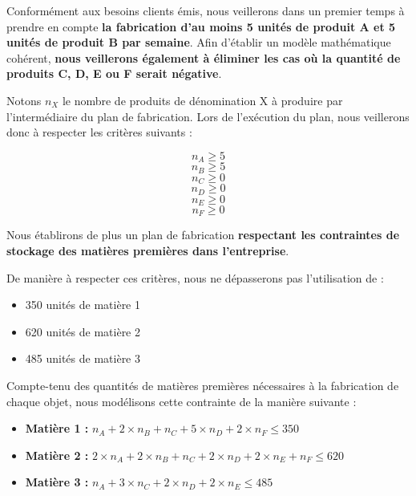 \documentclass[a4paper,10pt]{article}
\begin{document}
Conformément aux besoins clients émis, nous veillerons dans un premier temps à prendre en compte \textbf{la fabrication d'au moins 5 unités de produit A et 5 unités de produit B par semaine}. Afin d'établir un modèle mathématique cohérent, \textbf{nous veillerons également à éliminer les cas où la quantité de produits C, D, E ou F serait négative}.\newline

Notons $n_X$ le nombre de produits de dénomination X à produire par l'intermédiaire du plan de fabrication. Lors de l'exécution du plan, nous veillerons donc à respecter les critères suivants :

$$n_A \geq 5$$
$$n_B \geq 5$$
$$n_C \geq 0$$
$$n_D \geq 0$$
$$n_E \geq 0$$
$$n_F \geq 0$$

Nous établirons de plus un plan de fabrication \textbf{respectant les contraintes de stockage des matières premières dans l'entreprise}.

De manière à respecter ces critères, nous ne dépasserons pas l'utilisation de :
\newline
\begin{itemize}
\item 350 unités de matière 1
\item 620 unités de matière 2
\item 485 unités de matière 3\newline
\end{itemize}

Compte-tenu des quantités de matières premières nécessaires à la fabrication de chaque objet, nous modélisons cette contrainte de la manière suivante :
\newline
\begin{itemize}
\item[\textbullet]  \textbf{Matière 1 :} $n_A + 2 \times n_B + n_C + 5 \times n_D + 2 \times n_F \leq 350$
\item[\textbullet]  \textbf{Matière 2 :} $2 \times n_A + 2 \times n_B + n_C + 2 \times n_D + 2 \times n_E + n_F \leq 620$
\item[\textbullet]  \textbf{Matière 3 :} $n_A + 3 \times n_C + 2 \times n_D + 2 \times n_E \leq 485$\newline
\end{itemize}
\end{document}
